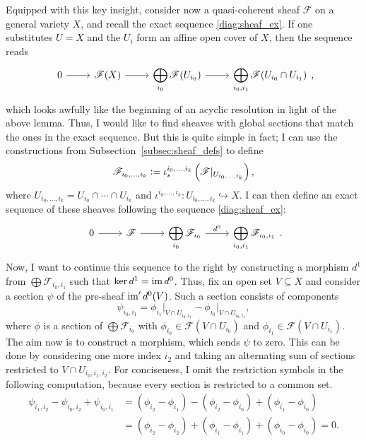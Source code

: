 Equipped with this key insight, consider now
a quasi-coherent sheaf $\mathscr{F}$ on a general variety $X$, and
recall the exact sequence \eqref{diag:sheaf_ex}. If one substitutes $U=X$
and the $U_{i}$ form an affine open cover of $X$, then the sequence reads
\[\begin{tikzcd}
    0\rar & \mathscr{F}(X)\rar
    & \displaystyle\bigoplus_{i_{0}}\mathscr{F}(U_{i_{0}})\rar
    & \displaystyle\bigoplus_{i_{0},i_{1}}\mathscr{F}(U_{i_{0}}\cap U_{i_{1}})
  \end{tikzcd},\]
which looks awfully like the beginning of an acyclic resolution in light of
the above lemma. Thus, I would like to find sheaves with
global sections that match the ones in the exact sequence.
But this is quite simple in fact; I can use the constructions
from Subsection~\ref{subsec:sheaf_defs} to define
\[
  \mathscr{F}_{i_{0},\ldots,i_{k}}\vcentcolon=\iota^{i_{0},\ldots,i_{k}}_{\ast}\left(
    \mathscr{F}\vert_{U_{i_{0},\ldots,i_{k}}}
  \right),
\]
where $U_{i_{0},\ldots, i_{k}}=U_{i_{0}}\cap\cdots\cap U_{i_{k}}$
and $\iota^{i_{0},\ldots,i_{k}}\colon U_{i_{0},\ldots,i_{k}}\hookrightarrow X$.
I can then define an exact sequence of these sheaves following the sequence
\eqref{diag:sheaf_ex}:
\[\begin{tikzcd}
    0\rar & \mathscr{F}\rar
    & \displaystyle\bigoplus_{i_{0}}\mathscr{F}_{i_{0}}\rar{d^{0}}
    & \displaystyle\bigoplus_{i_{0},i_{1}}\mathscr{F}_{i_{0},i_{1}}
  \end{tikzcd}.\]
Now, I want to continue this sequence to the right by constructing a
morphism $d^{1}$ from $\displaystyle\bigoplus\mathscr{F}_{i_{0},i_{1}}$
such that $\ker d^{1}=\operatorname{im} d^{0}$. Thus, fix an open set $V\subseteq X$ and
consider a section $\psi$ of the pre-sheaf $\operatorname{im}^{\prime} d^{0}(V)$. Such a
section consists of components
\[
  \psi_{i_{0},i_{1}}=\phi_{i_{1}}\vert_{V\cap U_{i_{0},i_{1}}}
  -\phi_{i_{0}}\vert_{V\cap U_{i_{0},i_{1}}},
\] %
where $\phi$ is a section of $\displaystyle\bigoplus\mathscr{F}_{i_{0}}$ with
$\phi_{i_{0}}\in\mathscr{F}(V\cap U_{i_{0}})$ and
$\phi_{i_{1}}\in\mathscr{F}(V\cap U_{i_{1}})$. The aim now is to construct a
morphism, which sends $\psi$ to zero. This can be done by considering one
more index $i_{2}$ and taking an alternating sum of sections restricted to
$V\cap U_{i_{0},i_{1},i_{2}}$. For conciseness, I omit the restriction symbols
in the following computation, because every section is restricted to a
common set.
\begin{align*}
  \psi_{i_{1},i_{2}}-\psi_{i_{0},i_{2}}+\psi_{i_{0},i_{1}}
  &=(\phi_{i_{2}}-\phi_{i_{1}})-(\phi_{i_{2}}-\phi_{i_{0}})
    +(\phi_{i_{1}}-\phi_{i_{0}}) \\
  &=(\phi_{i_{2}}-\phi_{i_{2}})+(\phi_{i_{1}}-\phi_{i_{1}})
    +(\phi_{i_{0}}-\phi_{i_{0}})=0.
\end{align*}

